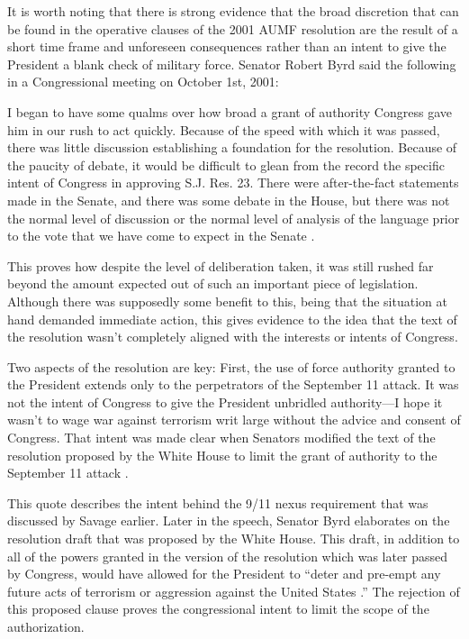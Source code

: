 \documentclass[12pt]{article}
\begin{document}
It is worth noting that there is strong evidence that the broad discretion that can be found in the operative clauses of the 2001 AUMF resolution are the result of a short time frame and unforeseen consequences rather than an intent to give the President a blank check of military force.
Senator Robert Byrd said the following in a Congressional meeting on October 1st, 2001:

\begin{displayquote}
I began to have some qualms over how broad a grant of authority Congress
gave him in our rush to act quickly.
Because of the speed with which it was passed, there was little discussion establishing a foundation for the resolution.
Because of the paucity of debate, it would be difficult to glean from the
record the specific intent of Congress in approving S.J. Res. 23.
There were after-the-fact statements made in the Senate, and there was some debate in the House, but there was not the normal level of discussion or the normal
level of analysis of the language prior to the vote that we have come to expect in the Senate \autocite[S9949]{byrd2001a}.
\end{displayquote}

This proves how despite the level of deliberation taken, it was still rushed far beyond the amount expected out of such an important piece of legislation.
Although there was supposedly some benefit to this, being that the situation at hand demanded immediate action, this gives evidence to the idea that the text of the resolution wasn't completely aligned with the interests or intents of Congress.

\begin{displayquote}
Two aspects of the resolution are key: First, the use of force authority granted to the President extends only to the perpetrators of the September 11 attack.
It was not the intent of Congress to give the President unbridled authority—I hope it wasn’t to wage war against terrorism writ large without the advice and consent of Congress.
That intent was made clear when Senators modified the text of the resolution proposed by the White House to limit the grant of authority to the September 11 attack \autocite[S9949]{byrd2001a}.
\end{displayquote}

This quote describes the intent behind the 9/11 nexus requirement that was discussed by Savage earlier.
Later in the speech, Senator Byrd elaborates on the resolution draft that was proposed by the White House.
This draft, in addition to all of the powers granted in the version of the resolution which was later passed by Congress, would have allowed for the President to ``deter and pre-empt any future acts of terrorism or aggression against the United States \autocite[S9949]{byrd2001a}.''
The rejection of this proposed clause proves the congressional intent to limit the scope of the authorization.
\end{document}
